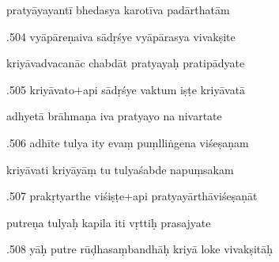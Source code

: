 \documentclass[article,12pt,a4paper]{memoir}%
\newcounter{parCount}
\begin{document}
	  
	  \pstart \leavevmode%
	pratyāyayantī bhedasya karotīva padārthatām 
	{}
	\pend%
      

	  
	  \pstart {}.504 vyāpāreṇaiva sādṛśye vyāpārasya vivakṣite 
	{}
	\pend%
      

	  
	  \pstart \leavevmode%
	kriyāvadvacanāc chabdāt pratyayaḥ pratipādyate 
	{}
	\pend%
      

	  
	  \pstart {}.505 kriyāvato+api sādṛśye vaktum iṣṭe kriyāvatā 
	{}
	\pend%
      

	  
	  \pstart \leavevmode%
	adhyetā brāhmaṇa iva pratyayo na nivartate 
	{}
	\pend%
      

	  
	  \pstart {}.506 adhīte tulya ity evaṃ puṃlliṅgena viśeṣaṇam 
	{}
	\pend%
      

	  
	  \pstart \leavevmode%
	kriyāvati kriyāyāṃ tu tulyaśabde napuṃsakam 
	{}
	\pend%
      

	  
	  \pstart {}.507 prakṛtyarthe viśiṣṭe+api   pratyayārthāviśeṣaṇāt 
	{}
	\pend%
      

	  
	  \pstart \leavevmode%
	putreṇa tulyaḥ kapila iti vṛttiḥ prasajyate 
	{}
	\pend%
      

	  
	  \pstart {}.508 yāḥ putre rūḍhasaṃbandhāḥ kriyā loke vivakṣitāḥ 
	{}
	\pend%
      
\end{document}
